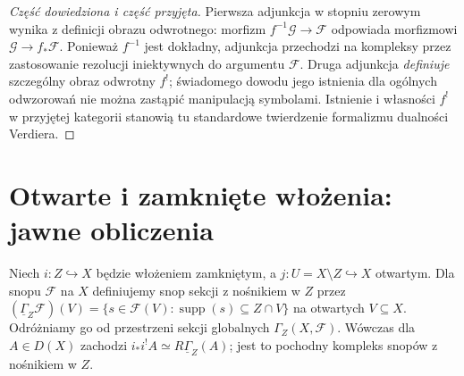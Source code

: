\begin{proof}[Część dowiedziona i część przyjęta]
Pierwsza adjunkcja w stopniu zerowym wynika z definicji obrazu
odwrotnego: morfizm $f^{-1}\mathcal G\to\mathcal F$
odpowiada morfizmowi $\mathcal G\to f_*\mathcal F$.
Ponieważ $f^{-1}$ jest dokładny, adjunkcja przechodzi na
kompleksy przez zastosowanie rezolucji iniektywnych do
argumentu $\mathcal F$.
Druga adjunkcja \emph{definiuje} szczególny obraz odwrotny $f^!$;
świadomego dowodu jego istnienia dla ogólnych odwzorowań nie można
zastąpić manipulacją symbolami. Istnienie i własności $f^!$
w przyjętej kategorii stanowią tu standardowe twierdzenie
formalizmu dualności Verdiera.
\end{proof}

\section{Otwarte i zamknięte włożenia: jawne obliczenia}
Niech $i:Z\hookrightarrow X$ będzie włożeniem zamkniętym,
a $j:U=X\setminus Z\hookrightarrow X$ otwartym.
Dla snopu $\mathcal F$ na $X$ definiujemy snop sekcji
z nośnikiem w $Z$ przez
$(\underline\Gamma_Z\mathcal F)(V)=
\{s\in\mathcal F(V):\operatorname{supp}(s)\subseteq Z\cap V\}$
na otwartych $V\subseteq X$. Odróżniamy go od przestrzeni
sekcji globalnych $\Gamma_Z(X,\mathcal F)$.
Wówczas dla $A\in D(X)$ zachodzi
$i_*i^!A\simeq R\underline\Gamma_Z(A)$;
jest to pochodny kompleks snopów z nośnikiem w $Z$.

